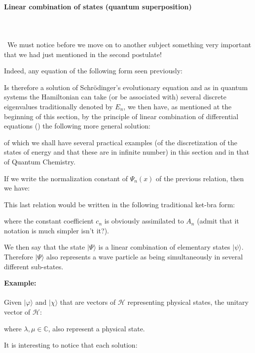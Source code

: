 	
	\paragraph{Linear combination of states (quantum superposition)}\label{quantum superposition}\mbox{}\\\\\
	We must notice before we move on to another subject something very important that we had just mentioned in the second postulate!

	Indeed, any equation of the following form seen previously:
	
	Is therefore a solution of Schrödinger's evolutionary equation and as in quantum systems the Hamiltonian can take (or be associated with) several discrete eigenvalues traditionally denoted by $E_n$, we then have, as mentioned at the beginning of this section, by the principle of linear combination of differential equations () the following more general solution:
	
	of which we shall have several practical examples (of the discretization of the states of energy and that these are in infinite number) in this section and in that of Quantum Chemistry.

	If we write the normalization constant of $\Psi_n(x)$ of the previous relation, then we have:
	
	This last relation would be written in the following traditional ket-bra form:
	
	where the constant coefficient $c_n$ is obviously assimilated to $A_n$ (admit that it notation is much simpler isn't it?).
	
	We then say that the state $|\Psi\rangle$ is a linear combination of elementary states $|\psi\rangle$. Therefore $|\Psi\rangle$ also represents a wave particle as being simultaneously in several different sub-states.
	\begin{tcolorbox}[colframe=black,colback=white,sharp corners]
	\textbf{{\Large {}}Example:}\\\\
	Given $|\varphi\rangle$ and $|\chi\rangle$ that are vectors of $\mathcal{H}$ representing physical states, the unitary vector of $\mathcal{H}$:
	
	where $\lambda,\mu\in\mathbb{C}$, also represent a physical state.
	\end{tcolorbox}
	It is interesting to notice that each solution:
	
